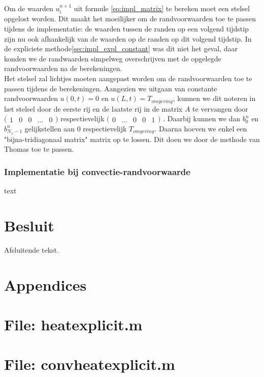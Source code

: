 \documentclass[a4paper,kulak]{kulakarticle} %
\newcommand{\inputcode}[1]{
	
}
\begin{document}
Om de waarden $u_i^{n+1}$ uit formule \ref{eq:impl_matrix} te bereken moet een stelsel opgelost worden. Dit maakt het moeilijker om de randvoorwaarden toe te passen tijdens de implementatie: de waarden tussen de randen op een volgend tijdstip zijn nu ook afhankelijk van de waarden op de randen op dit volgend tijdstip. In de expliciete methode\ref{sec:impl_expl_constant} was dit niet het geval, daar konden we de randwaarden simpelweg overschrijven met de opgelegde randvoorwaarden na de berekeningen. \\
Het stelsel zal lichtjes moeten aangepast worden om de randvoorwaarden toe te passen tijdens de berekeningen. Aangezien we uitgaan van constante randvoorwaarden $u(0, t) = 0$ en $u(L, t) = T_{omgeving}$, kunnen we dit noteren in het stelsel door de eerste rij en de laatste rij in de matrix $A$ te vervangen door
$\big(\begin{smallmatrix}
	1 & 0 & 0 & \dots & 0
\end{smallmatrix}\big)$ 
respectievelijk
$\big(\begin{smallmatrix}
	0 & \dots & 0 & 0 & 1
\end{smallmatrix}\big)$
. Daarbij kunnen we dan $b_0^n$ en $b_{N_x - 1}^n$ gelijkstellen aan $0$ respectievelijk $T_{omgeving}$. Daarna hoeven we enkel een "bijna-tridiagonaal matrix" matrix op te lossen. Dit doen we door de methode van Thomas toe te passen. %

\subsubsection{Implementatie bij convectie-randvoorwaarde}

text

\section*{Besluit}

Afsluitende tekst.

\section*{Appendices}

\appendix

\section{File: heat\textunderscore explicit.m}
	\label{code:heat_explicit}
	\inputcode{heat_explicit}
	
\section{File: convheat\textunderscore explicit.m}
	\label{code:convheat_explicit}
	\inputcode{convheat_explicit}
	
\end{document}
